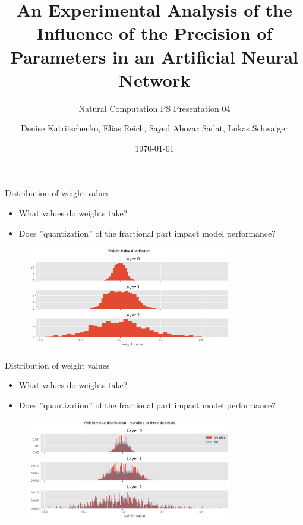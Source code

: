 \documentclass[aspectratio=169]{beamer} %
\title{An Experimental Analysis of the Influence of the Precision of Parameters in an Artificial Neural Network}
\subtitle{Natural Computation PS Presentation 04}
\author[D. K., E. R., S. A. S., L. S.]{Denise Katritschenko, Elias Reich, Sayed Abozar Sadat, Lukas Schwaiger}
\institute[\plusshort]{\pluslong\\ Department of Artificial Intelligence and Human Interfaces (AIHI)}
\date[\today]{\today}
\begin{document}
\frame{\titlepage}
\begin{frame}{Distribution of weight values}
  \begin{itemize}
    \item What values do weights take?
    \item Does ''quantization'' of the fractional part impact model performance?
  \end{itemize}

  \begin{figure}
    \centering  
    \includegraphics[width=0.8\textwidth]{figures/118_dist.png}
  \end{figure}
\end{frame}

\begin{frame}{Distribution of weight values}
  \begin{itemize}
    \item What values do weights take?
    \item Does ''quantization'' of the fractional part impact model performance?
  \end{itemize}

  \begin{figure}
    \centering  
    \includegraphics[width=0.8\textwidth]{figures/118_dist3.png}
  \end{figure}
\end{frame}
\end{document}
